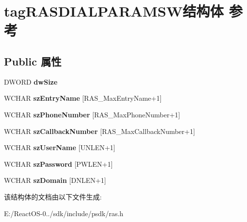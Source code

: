 \hypertarget{structtag_r_a_s_d_i_a_l_p_a_r_a_m_s_w}{}\section{tag\+R\+A\+S\+D\+I\+A\+L\+P\+A\+R\+A\+M\+S\+W结构体 参考}
\label{structtag_r_a_s_d_i_a_l_p_a_r_a_m_s_w}
\subsection*{Public 属性}
\begin{DoxyCompactItemize}
\item 
\mbox{\label{structtag_r_a_s_d_i_a_l_p_a_r_a_m_s_w_a8098f7593780a1bc34651d7480917f2b}} 
D\+W\+O\+RD {\bfseries dw\+Size}
\item 
\mbox{\label{structtag_r_a_s_d_i_a_l_p_a_r_a_m_s_w_a2ef4642078eb85752a78d40ad6d4c0e5}} 
W\+C\+H\+AR {\bfseries sz\+Entry\+Name} \mbox{[}R\+A\+S\+\_\+\+Max\+Entry\+Name+1\mbox{]}
\item 
\mbox{\label{structtag_r_a_s_d_i_a_l_p_a_r_a_m_s_w_a54358fa2ba4bf770a22b16d7b2559adc}} 
W\+C\+H\+AR {\bfseries sz\+Phone\+Number} \mbox{[}R\+A\+S\+\_\+\+Max\+Phone\+Number+1\mbox{]}
\item 
\mbox{\label{structtag_r_a_s_d_i_a_l_p_a_r_a_m_s_w_a7eb116ca435c846a49502d77b0f068f1}} 
W\+C\+H\+AR {\bfseries sz\+Callback\+Number} \mbox{[}R\+A\+S\+\_\+\+Max\+Callback\+Number+1\mbox{]}
\item 
\mbox{\label{structtag_r_a_s_d_i_a_l_p_a_r_a_m_s_w_a61069334d2fe0540219fa4dc560726c8}} 
W\+C\+H\+AR {\bfseries sz\+User\+Name} \mbox{[}U\+N\+L\+EN+1\mbox{]}
\item 
\mbox{\label{structtag_r_a_s_d_i_a_l_p_a_r_a_m_s_w_a4cc7d381cdc2b3d8a5f17bdc42252cbb}} 
W\+C\+H\+AR {\bfseries sz\+Password} \mbox{[}P\+W\+L\+EN+1\mbox{]}
\item 
\mbox{\label{structtag_r_a_s_d_i_a_l_p_a_r_a_m_s_w_a0e4f2a802e81325a047e5f9bcf12513d}} 
W\+C\+H\+AR {\bfseries sz\+Domain} \mbox{[}D\+N\+L\+EN+1\mbox{]}
\end{DoxyCompactItemize}


该结构体的文档由以下文件生成\+:\begin{DoxyCompactItemize}
\item 
E\+:/\+React\+O\+S-\/0../sdk/include/psdk/ras.\+h\end{DoxyCompactItemize}
